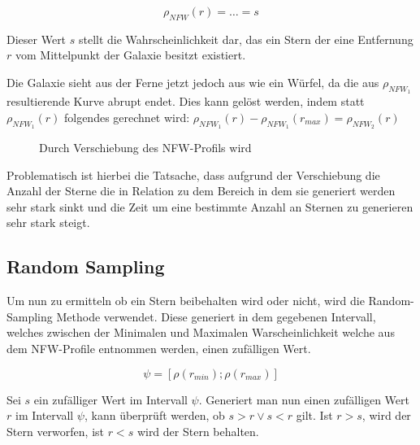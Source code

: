 \begin{equation}
\rho_{NFW}(r) = \dots = s
\end{equation}

Dieser Wert \( s \) stellt die Wahrscheinlichkeit dar, das ein Stern der
eine Entfernung \( r \) vom Mittelpunkt der Galaxie besitzt existiert.

Die Galaxie sieht aus der Ferne jetzt jedoch aus wie ein Würfel, da die aus \(
\rho_{NFW_{1}} \) resultierende Kurve abrupt endet. Dies kann gelöst werden,
indem statt \( \rho_{NFW_{1}}(r) \) folgendes gerechnet wird: \(
\rho_{NFW_{1}}(r) - \rho_{NFW_{1}}(r_{max}) = \rho_{NFW_{2}}(r)\)

\begin{figure}
\centering
{}
\caption{Durch Verschiebung des NFW-Profils wird }
\end{figure}

Problematisch ist hierbei die Tatsache, dass aufgrund der Verschiebung die
Anzahl der Sterne die in Relation zu dem Bereich in dem sie generiert werden
sehr stark sinkt und die Zeit um eine bestimmte Anzahl an Sternen zu generieren
sehr stark steigt.

\subsection{Random Sampling} \label{subsec:random_sampling}

Um nun zu ermitteln ob ein Stern beibehalten wird oder nicht, wird die
Random-Sampling Methode verwendet.  Diese generiert in dem gegebenen Intervall,
welches zwischen der Minimalen und Maximalen Warscheinlichkeit welche aus dem
NFW-Profile entnommen werden, einen zufälligen Wert.

\begin{equation}\label{range:psi}
    \psi = [ \rho(r_{min}); \rho(r_{max}) ] 
\end{equation}

Sei \( s \) ein zufälliger Wert im Intervall \( \psi \).  Generiert man nun
einen zufälligen Wert \( r \) im Intervall \( \psi \), kann überprüft werden, ob \( s
> r \lor s < r \) gilt. Ist \( r
> s \), wird der Stern verworfen, ist \( r < s \) wird der Stern behalten.

